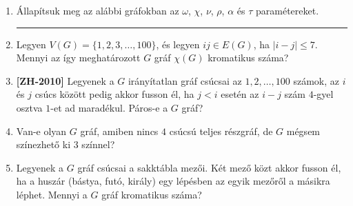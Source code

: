 \documentclass[a4paper, 12pt]{article}
\begin{document}
\begin{enumerate}
            \item Állapítsuk meg az alábbi gráfokban az $\omega$, $\chi$, $\nu$, $\rho$, $\alpha$ és $\tau$ paramétereket.
            \begin{figure}[!h]
                \centering
                \begin{subfigure}{0.24\textwidth}
                    \centering		
                    
                \end{subfigure}
                \begin{subfigure}{0.24\textwidth}
                    \centering
                    
                \end{subfigure}
                \begin{subfigure}{0.24\textwidth}
                    \centering
                    
                \end{subfigure}
                \begin{subfigure}{0.24\textwidth}
                    \centering
                    
                \end{subfigure}
            \end{figure}
            
            \hrule

            \item Legyen $V(G)=\{1,2,3, \ldots , 100\}$, és legyen $ij \in E(G)$, ha $|i-j|\leq 7$. Mennyi az így meghatározott $G$ gráf $\chi(G)$ kromatikus száma?
            
            \item \textbf{[ZH-2010]} Legyenek a $G$ irányítatlan gráf csúcsai az $1, 2, \ldots, 100$ számok, az $i$ és $j$ csúcs között pedig akkor fusson él, ha $j<i$ esetén az $i-j$ szám $4$-gyel osztva $1$-et ad maradékul. Páros-e a $G$ gráf?
            
            \item Van-e olyan $G$ gráf, amiben nincs $4$ csúcsú teljes részgráf, de $G$ mégsem színezhető ki $3$ színnel?
            
            \item Legyenek a $G$ gráf csúcsai a sakktábla mezői. Két mező közt akkor fusson él, ha a huszár (bástya, futó, király) egy lépésben az egyik mezőről a másikra léphet. Mennyi a $G$ gráf kromatikus száma?
            

\end{enumerate}
\end{document}
